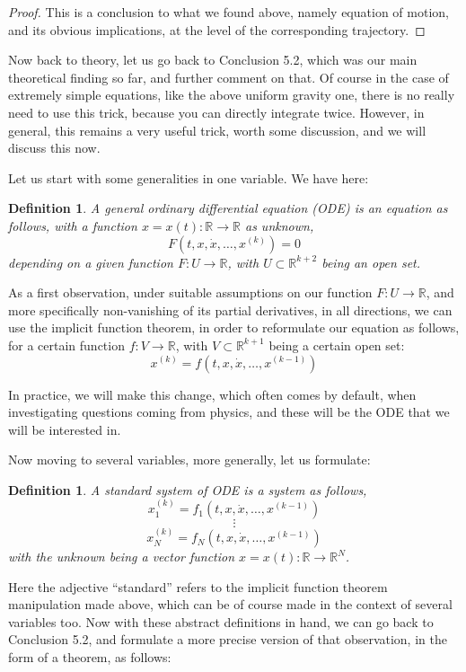 \documentclass[12pt]{amsbook}
\newtheorem{definition}[theorem]{Definition}
\begin{document}
\begin{proof}
This is a conclusion to what we found above, namely equation of motion, and its obvious implications, at the level of the corresponding trajectory.
\end{proof}

Now back to theory, let us go back to Conclusion 5.2, which was our main theoretical finding so far, and further comment on that. Of course in the case of extremely simple equations, like the above uniform gravity one, there is no really need to use this trick, because you can directly integrate twice. However, in general, this remains a very useful trick, worth some discussion, and we will discuss this now.

\bigskip

Let us start with some generalities in one variable. We have here:

\begin{definition}
A general ordinary differential equation (ODE) is an equation as follows, with a function $x=x(t):\mathbb R\to\mathbb R$ as unknown, 
$$F(t,x,\dot{x},\ldots,x^{(k)})=0$$
depending on a given function $F:U\to\mathbb R$, with $U\subset\mathbb R^{k+2}$ being an open set.
\end{definition}

As a first observation, under suitable assumptions on our function $F:U\to\mathbb R$, and more specifically non-vanishing of its partial derivatives, in all directions, we can use the implicit function theorem, in order to reformulate our equation as follows, for a certain function $f:V\to\mathbb R$, with $V\subset\mathbb R^{k+1}$ being a certain open set:
$$x^{(k)}=f(t,x,\dot{x},\ldots,x^{(k-1)})$$

In practice, we will make this change, which often comes by default, when investigating questions coming from physics, and these will be the ODE that we will be interested in. 

\bigskip

Now moving to several variables, more generally, let us formulate:

\begin{definition}
A standard system of ODE is a system as follows,
$$x_1^{(k)}=f_1(t,x,\dot{x},\ldots,x^{(k-1)})$$
$$\vdots$$
$$x_N^{(k)}=f_N(t,x,\dot{x},\ldots,x^{(k-1)})$$
with the unknown being a vector function $x=x(t):\mathbb R\to\mathbb R^N$.
\end{definition}

Here the adjective ``standard'' refers to the implicit function theorem manipulation made above, which can be of course made in the context of several variables too. Now with these abstract definitions in hand, we can go back to Conclusion 5.2, and formulate a more precise version of that observation, in the form of a theorem, as follows:
\end{document}
